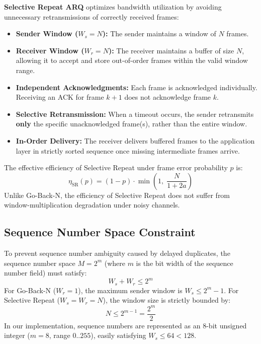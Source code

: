 \documentclass[11pt,a4paper]{article}
\begin{document}
\textbf{Selective Repeat ARQ} optimizes bandwidth utilization by avoiding unnecessary retransmissions of correctly received frames:
\begin{itemize}
    \item \textbf{Sender Window (\(W_s = N\)):} The sender maintains a window of \(N\) frames.
    \item \textbf{Receiver Window (\(W_r = N\)):} The receiver maintains a buffer of size \(N\), allowing it to accept and store out-of-order frames within the valid window range.
    \item \textbf{Independent Acknowledgments:} Each frame is acknowledged individually. Receiving an ACK for frame \(k+1\) does not acknowledge frame \(k\).
    \item \textbf{Selective Retransmission:} When a timeout occurs, the sender retransmits \textbf{only} the specific unacknowledged frame(s), rather than the entire window.
    \item \textbf{In-Order Delivery:} The receiver delivers buffered frames to the application layer in strictly sorted sequence once missing intermediate frames arrive.
\end{itemize}
The effective efficiency of Selective Repeat under frame error probability \(p\) is:
\begin{equation}
    \eta_{\text{SR}}(p) = (1 - p) \cdot \min\left(1, \; \frac{N}{1 + 2a}\right)
\end{equation}
Unlike Go-Back-N, the efficiency of Selective Repeat does not suffer from window-multiplication degradation under noisy channels.

\subsection{Sequence Number Space Constraint}

To prevent sequence number ambiguity caused by delayed duplicates, the sequence number space \(M = 2^m\) (where \(m\) is the bit width of the sequence number field) must satisfy:
\begin{equation}
    W_s + W_r \le 2^m
\end{equation}
For Go-Back-N (\(W_r = 1\)), the maximum sender window is \(W_s \le 2^m - 1\). For Selective Repeat (\(W_s = W_r = N\)), the window size is strictly bounded by:
\begin{equation}
    N \le 2^{m-1} = \frac{2^m}{2}
\end{equation}
In our implementation, sequence numbers are represented as an 8-bit unsigned integer (\(m = 8\), range \(0..255\)), easily satisfying \(W_s \le 64 < 128\).
\end{document}

